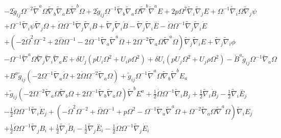 \documentclass[10pt,letterpaper]{article}
\numberwithin{equation}{section}
\begin{document}
\begin{eqnarray}
&& - 2 \tilde{g}_{ij} \Omega^{-2} \tilde{\nabla}^{a}\Omega \tilde{\nabla}_{b}\tilde{\nabla}_{a}E \tilde{\nabla}^{b}\Omega + 2 \tilde{g}_{ij} \Omega^{-1} \tilde{\nabla}_{b}\tilde{\nabla}_{a}\Omega \tilde{\nabla}^{b}\tilde{\nabla}^{a}E + 2 p \Omega^2 \tilde{\nabla}_{i}\tilde{\nabla}_{j}E + \Omega^{-1} \tilde{\nabla}_{i}\Omega \tilde{\nabla}_{j}\psi \nonumber \\ 
&& + \Omega^{-1} \tilde{\nabla}_{i}\psi \tilde{\nabla}_{j}\Omega + \dot{\Omega} \Omega^{-1} \tilde{\nabla}_{j}\tilde{\nabla}_{i}B + \tilde{\nabla}_{j}\tilde{\nabla}_{i}\dot{B} -  \tilde{\nabla}_{j}\tilde{\nabla}_{i}\overset{..}{E} -  \dot{\Omega} \Omega^{-1} \tilde{\nabla}_{j}\tilde{\nabla}_{i}\dot{E} \nonumber \\ 
&& + (-2 \dot{\Omega}^2 \Omega^{-2} + 2 \overset{..}{\Omega} \Omega^{-1} - 2 \Omega^{-1} \tilde{\nabla}_{a}\tilde{\nabla}^{a}\Omega + 2 \Omega^{-2} \tilde{\nabla}_{a}\Omega \tilde{\nabla}^{a}\Omega) \tilde{\nabla}_{j}\tilde{\nabla}_{i}E + \tilde{\nabla}_{j}\tilde{\nabla}_{i}\phi \nonumber \\ 
&& -  \Omega^{-1} \tilde{\nabla}^{a}\Omega \tilde{\nabla}_{j}\tilde{\nabla}_{i}\tilde{\nabla}_{a}E+\delta U_{j} (p U_{i} \Omega^2 + U_{i} \rho \Omega^2) + \delta U_{i} (p U_{j} \Omega^2 + U_{j} \rho \Omega^2) -  \dot{B}^{a} \tilde{g}_{ij} \Omega^{-1} \tilde{\nabla}_{a}\Omega \nonumber \\ 
&& + B^{a} \tilde{g}_{ij} (-2 \Omega^{-1} \tilde{\nabla}_{a}\dot{\Omega} + 2 \dot{\Omega} \Omega^{-2} \tilde{\nabla}_{a}\Omega) + \tilde{g}_{ij} \Omega^{-1} \tilde{\nabla}^{a}\Omega \tilde{\nabla}_{b}\tilde{\nabla}^{b}E_{a} \nonumber \\ 
&& + \tilde{g}_{ij} (-2 \Omega^{-2} \tilde{\nabla}_{a}\Omega \tilde{\nabla}_{b}\Omega + 2 \Omega^{-1} \tilde{\nabla}_{b}\tilde{\nabla}_{a}\Omega) \tilde{\nabla}^{b}E^{a} + \tfrac{1}{2} \dot{\Omega} \Omega^{-1} \tilde{\nabla}_{i}B_{j} + \tfrac{1}{2} \tilde{\nabla}_{i}\dot{B}_{j} -  \tfrac{1}{2} \tilde{\nabla}_{i}\overset{..}{E}_{j} \nonumber \\ 
&& -  \tfrac{1}{2} \dot{\Omega} \Omega^{-1} \tilde{\nabla}_{i}\dot{E}_{j} + (- \dot{\Omega}^2 \Omega^{-2} + \overset{..}{\Omega} \Omega^{-1} + p \Omega^2 -  \Omega^{-1} \tilde{\nabla}_{a}\tilde{\nabla}^{a}\Omega + \Omega^{-2} \tilde{\nabla}_{a}\Omega \tilde{\nabla}^{a}\Omega) \tilde{\nabla}_{i}E_{j} \nonumber \\ 
&& + \tfrac{1}{2} \dot{\Omega} \Omega^{-1} \tilde{\nabla}_{j}B_{i} + \tfrac{1}{2} \tilde{\nabla}_{j}\dot{B}_{i} -  \tfrac{1}{2} \tilde{\nabla}_{j}\overset{..}{E}_{i} -  \tfrac{1}{2} \dot{\Omega} \Omega^{-1} \tilde{\nabla}_{j}\dot{E}_{i} \nonumber \\ 

\end{eqnarray}
\end{document}
